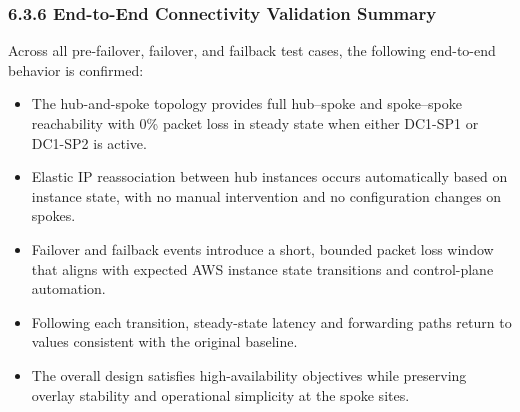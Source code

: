 \documentclass[11pt]{article}
\begin{document}
%
%
%
\subsubsection{6.3.6 End-to-End Connectivity Validation Summary}

Across all pre-failover, failover, and failback test cases, the following end-to-end behavior is confirmed:

\begin{itemize}
  \item The hub-and-spoke topology provides full hub--spoke and spoke--spoke reachability
        with 0\% packet loss in steady state when either DC1-SP1 or DC1-SP2 is active.
  \item Elastic IP reassociation between hub instances occurs automatically based on
        instance state, with no manual intervention and no configuration changes on spokes.
  \item Failover and failback events introduce a short, bounded packet loss window that
        aligns with expected AWS instance state transitions and control-plane automation.
  \item Following each transition, steady-state latency and forwarding paths return to
        values consistent with the original baseline.
  \item The overall design satisfies high-availability objectives while preserving
        overlay stability and operational simplicity at the spoke sites.
\end{itemize}

%
%
%
\end{document}
